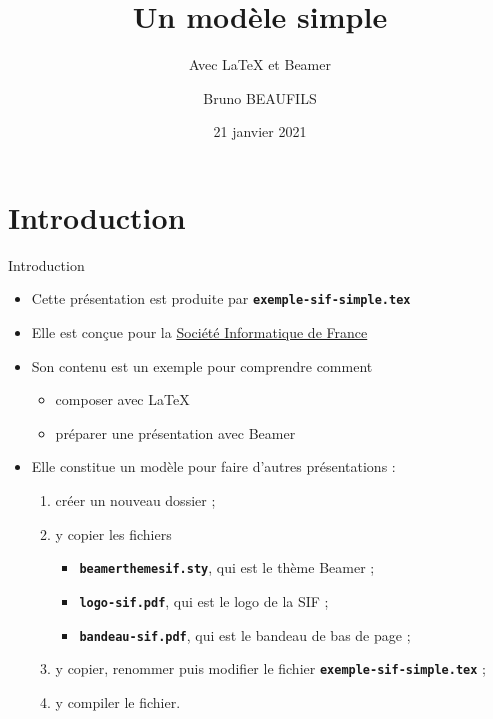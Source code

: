 \documentclass[10pt,t]{beamer}
\title[SIF]{Un modèle simple}
\subtitle{Avec \LaTeX{} et Beamer}
\author{Bruno BEAUFILS}
\institute[]{GT Moyens Informatiques}
\date{21 janvier 2021}
\begin{document}
\maketitle


\section{Introduction}

\begin{frame}{Introduction} 

  \begin{itemize}
  \item Cette présentation est produite par \texttt{\textbf{exemple-sif-simple.tex}}
  \item Elle est conçue pour la \href{https://www.societe-informatique-de-france.fr}{Société Informatique de France}
  \item Son contenu est un exemple pour comprendre comment

    \begin{itemize}
    \item composer avec \LaTeX{}
    \item préparer une présentation avec Beamer
    \end{itemize}

  \end{itemize}

  \pause


  \begin{itemize}
  \item Elle constitue un modèle pour faire d'autres présentations :
      
    \begin{enumerate}
    \item créer un nouveau dossier ;
    \item y copier les fichiers 
      
      \begin{itemize}
      \item \texttt{\textbf{beamerthemesif.sty}}, qui est le thème Beamer ;
      \item \texttt{\textbf{logo-sif.pdf}}, qui est le logo de la SIF ;
      \item \texttt{\textbf{bandeau-sif.pdf}}, qui est le bandeau de bas de page ;
      \end{itemize}
      
    \item y copier, renommer puis modifier le fichier \texttt{\textbf{exemple-sif-simple.tex}} ;
    \item y compiler le fichier.
    \end{enumerate}
  \end{itemize}
\end{frame}
\end{document}
